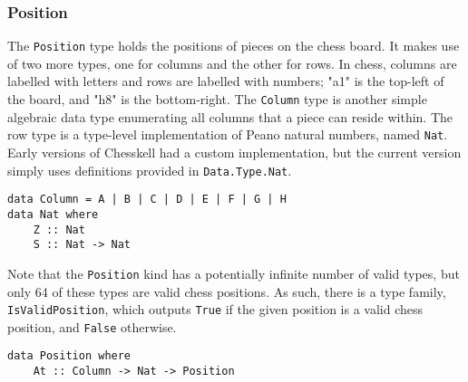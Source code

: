 \documentclass[12pt, a4paper, bibliography=totocnumbered]{scrartcl}
\begin{document}
\subsubsection{Position}

The \lstinline{Position} type holds the positions of pieces on the chess board. It makes use of two more types, one for columns and the other for rows. In chess, columns are labelled with letters and rows are labelled with numbers; "a1" is the top-left of the board, and "h8" is the bottom-right. The \lstinline{Column} type is another simple algebraic data type enumerating all columns that a piece can reside within. The row type is a type-level implementation of Peano natural numbers, named \lstinline{Nat}. Early versions of Chesskell had a custom implementation, but the current version simply uses definitions provided in \lstinline{Data.Type.Nat}.


\begin{lstlisting}
data Column = A | B | C | D | E | F | G | H
data Nat where
    Z :: Nat
    S :: Nat -> Nat
\end{lstlisting}

Note that the \lstinline{Position} kind has a potentially infinite number of valid types, but only 64 of these types are valid chess positions. As such, there is a type family, \lstinline{IsValidPosition}, which outputs \lstinline{True} if the given position is a valid chess position, and \lstinline{False} otherwise.


\begin{lstlisting}
data Position where
    At :: Column -> Nat -> Position
\end{lstlisting}
\end{document}
